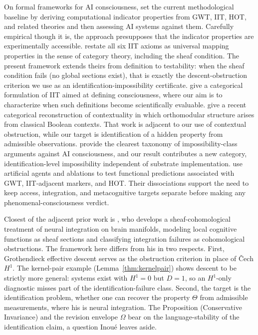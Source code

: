 \documentclass[11pt]{article}
\begin{document}
On formal frameworks for AI consciousness, \citet{butlin2023consciousness} set
the current methodological baseline by deriving computational indicator
properties from GWT, IIT, HOT, and related theories and then assessing AI
systems against them. Carefully empirical though it is, the approach presupposes
that the indicator properties are experimentally accessible.
\citet{phillips2024metamath} restate all six IIT axioms as
universal mapping properties in the sense of category theory, including the
sheaf condition.
The present framework extends theirs from definition to testability: when the sheaf
condition fails (no global sections exist), that is exactly the
descent-obstruction criterion we use as an identification-impossibility
certificate.
\citet{kleiner2021} give a categorical formulation of IIT aimed at defining
consciousness, where our aim is to characterize when such definitions become
scientifically evaluable.
\citet{gunji2026contextuality} give a recent categorical reconstruction of
contextuality in which orthomodular structure arises from classical Boolean
contexts.
That work is adjacent to our use of contextual obstruction, while our target
is identification of a hidden property from admissible observations.
\citet{campero2025framework} provide the clearest taxonomy of
impossibility-class arguments against AI consciousness, and our result
contributes a new category, identification-level impossibility independent of
substrate implementation.
\citet{phua2025test} use artificial agents and ablations to test functional
predictions associated with GWT, IIT-adjacent markers, and HOT.
Their dissociations support the need to keep access, integration, and
metacognitive targets separate before making any phenomenal-consciousness
verdict.

Closest of the adjacent prior work is \citet{inoue2026}, who develops a
sheaf-cohomological treatment of neural integration on brain manifolds, modeling
local cognitive functions as sheaf sections and classifying integration failures
as cohomological obstructions. The framework here differs from his in two
respects. First, Grothendieck effective descent serves as the obstruction
criterion in place of
\v{C}ech $H^1$. The kernel-pair example (Lemma~\ref{thm:kernelpair}) shows
descent to be strictly more general: systems exist with $H^1 = 0$ but $D = 1$,
so an $H^1$-only diagnostic misses part of the identification-failure class.
Second, the target is the identification problem, whether one can recover the
property $\Theta$ from admissible measurements, where his is neural integration.
The
Proposition (Conservative Invariance) and the revision envelope $\Omega$ bear on
the language-stability of the identification claim, a question Inou\'{e} leaves
aside.
\end{document}
